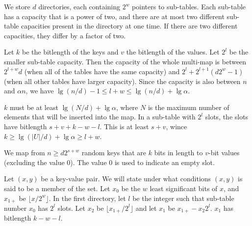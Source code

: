 \documentclass[11pt,letterpaper]{article}
\begin{document}
We store $d$ directories, each containing $2^w$ pointers to sub-tables.
Each sub-table has a capacity that is a power of two, and there are at most two different sub-table capacities present in the directory at one time.
If there are two different capacities, they differ by a factor of two.

Let $k$ be the bitlength of the keys and $v$ the bitlength of the values.
Let $2^l$ be the smaller sub-table capacity.
Then the capacity of the whole multi-map is between $2^{l+w}d$ (when all of the tables have the same capacity) and $2^l + 2^{l+1}(d 2^w - 1)$ (when all other tables have larger capacity).
Since the capacity is also between $n$ and $\alpha n$, we have $\lg (n/d) - 1 \leq l + w \leq \lg(n/d) + \lg \alpha$.

$k$ must be at least $\lg(N/d) + \lg \alpha$, where $N$ is the maximum number of elements that will be inserted into the map.
In a sub-table with $2^l$ slots, the slots have bitlength $s + v + k - w - l$.
This is at least $s + v$, wince $k \geq \lg(|U|/d) + \lg \alpha \geq l + w$.


We map from $n \geq d 2^{s+w}$ random keys that are $k$ bits in length to $v$-bit values (excluding the value $0$).
The value $0$ is used to indicate an empty slot.


Let $(x,y)$ be a key-value pair.
We will state under what conditions $(x,y)$ is said to be a member of the set.
Let $x_0$ be the $w$ least significant bits of $x$, and $x_{1+}$ be $\lfloor x / 2^w \rfloor$.
In the first directory, let $l$ be the integer such that sub-table number $x_0$ has $2^l$ slots.
Let $x_2$ be $\lfloor x_{1+} / 2^l \rfloor$ and let $x_1$ be $x_{1+} - x_2 2^l$.
$x_1$ has bitlength $k - w - l$.
\end{document}
